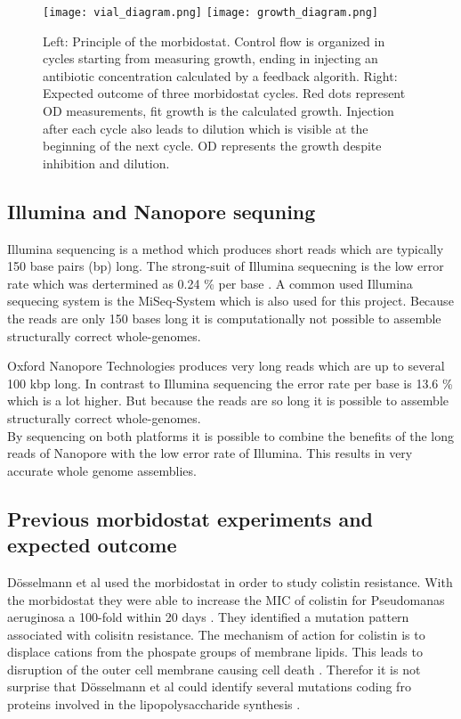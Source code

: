 \begin{figure}
	\texttt{[image: vial\_diagram.png]}
	\texttt{[image: growth\_diagram.png]}
	\caption{Left: Principle of the morbidostat. Control flow is organized in cycles starting from measuring growth, ending in injecting an antibiotic concentration calculated by a feedback algorith. Right: Expected outcome of three morbidostat cycles. Red dots represent OD measurements, fit growth is the calculated growth. Injection after each cycle also leads to dilution which is visible at the beginning of the next cycle. \textDelta OD represents the growth despite inhibition and dilution.}
	\label{figure:vial_setup}
\end{figure} 

\subsection{Illumina and Nanopore sequning}
Illumina sequencing is a method which produces short reads which are typically 150 base pairs (bp) long. The strong-suit of Illumina sequecning is the low error rate which was dertermined as 0.24 \% per base \cite{pfeiffer_systematic_2018}. A common used Illumina sequecing system is the MiSeq-System which is also used for this project. Because the reads are only 150 bases long it is computationally not possible to assemble structurally correct whole-genomes. 

Oxford Nanopore Technologies produces very long reads which are up to several 100 kbp long. In contrast to Illumina sequencing the error rate per base is 13.6 \% \cite{noauthor_resolving_nodate} which is a lot higher. But because the reads are so long it is possible to assemble structurally correct whole-genomes. \\
By sequencing on both platforms it is possible to combine the benefits of the long reads of Nanopore with the low error rate of Illumina. This results in very accurate whole genome assemblies.

\subsection{Previous morbidostat experiments and expected outcome}
Dösselmann et al \cite{doselmann_rapid_2017} used the morbidostat in order to study colistin resistance. With the morbidostat they were able to increase the MIC of colistin for Pseudomanas aeruginosa a 100-fold within 20 days \cite{doselmann_rapid_2017}. They identified a mutation pattern associated with colisitn resistance. The mechanism of action for colistin is to displace cations from the phospate groups of membrane lipids. This leads to disruption of the outer cell membrane causing cell death \cite{noauthor_colistin:_nodate}. Therefor it is not surprise that Dösselmann et al could identify several mutations coding fro proteins involved in the lipopolysaccharide synthesis \cite{doselmann_rapid_2017}.